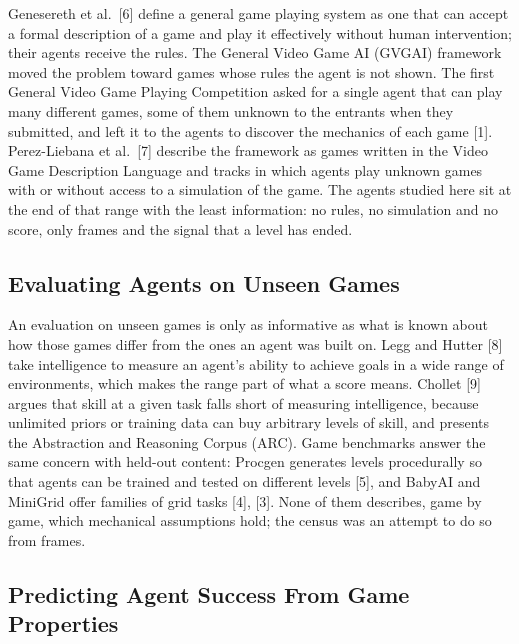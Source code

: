 \documentclass[journal]{IEEEtran}
\begin{document}
Genesereth et al.~{[}6{]} define a general game playing system as one
that can accept a formal description of a game and play it effectively
without human intervention; their agents receive the rules. The General
Video Game AI (GVGAI) framework moved the problem toward games whose
rules the agent is not shown. The first General Video Game Playing
Competition asked for a single agent that can play many different games,
some of them unknown to the entrants when they submitted, and left it to
the agents to discover the mechanics of each game {[}1{]}. Perez-Liebana
et al.~{[}7{]} describe the framework as games written in the Video Game
Description Language and tracks in which agents play unknown games with
or without access to a simulation of the game. The agents studied here
sit at the end of that range with the least information: no rules, no
simulation and no score, only frames and the signal that a level has
ended.

\subsection{Evaluating Agents on Unseen
Games}\label{evaluating-agents-on-unseen-games}

An evaluation on unseen games is only as informative as what is known
about how those games differ from the ones an agent was built on. Legg
and Hutter {[}8{]} take intelligence to measure an agent's ability to
achieve goals in a wide range of environments, which makes the range
part of what a score means. Chollet {[}9{]} argues that skill at a given
task falls short of measuring intelligence, because unlimited priors or
training data can buy arbitrary levels of skill, and presents the
Abstraction and Reasoning Corpus (ARC). Game benchmarks answer the same
concern with held-out content: Procgen generates levels procedurally so
that agents can be trained and tested on different levels {[}5{]}, and
BabyAI and MiniGrid offer families of grid tasks {[}4{]}, {[}3{]}. None
of them describes, game by game, which mechanical assumptions hold; the
census was an attempt to do so from frames.

\subsection{Predicting Agent Success From Game
Properties}\label{predicting-agent-success-from-game-properties}
\end{document}
